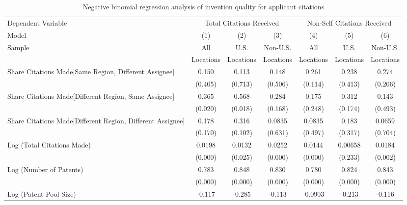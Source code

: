 \begin{sidewaystable}[htbp]\centering
\caption{Negative binomial regression analysis of invention quality for applicant citations \label{a.model123192021}}
\small
\onehalfspacing
\begin{tabular}{l*{6}{c}}
\hline\hline
 Dependent Variable&\multicolumn{3}{c}{Total Citations Received}&\multicolumn{3}{c}{Non-Self Citations Received}\\
                Model&\multicolumn{1}{c}{(1)}&\multicolumn{1}{c}{(2)}&\multicolumn{1}{c}{(3)}&\multicolumn{1}{c}{(4)}&\multicolumn{1}{c}{(5)}&\multicolumn{1}{c}{(6)}\\
                 \hline
 \multirow{2}{*}{Sample}&\multicolumn{1}{c}{All}&\multicolumn{1}{c}{U.S.}&\multicolumn{1}{c}{Non-U.S.}&\multicolumn{1}{c}{All}&\multicolumn{1}{c}{U.S.}&\multicolumn{1}{c}{Non-U.S.}\\       
  &\multicolumn{1}{c}{Locations}&\multicolumn{1}{c}{Locations}&\multicolumn{1}{c}{Locations}&\multicolumn{1}{c}{Locations}&\multicolumn{1}{c}{Locations}&\multicolumn{1}{c}{Locations}\\       
\hline
Share Citations Made[Same Region, Different Assignee]&    0.150&    0.113&    0.148&    0.261&    0.238&    0.274\\
                &  (0.405)&  (0.713)&  (0.506)&  (0.114)&  (0.413)&  (0.206)\\
Share Citations Made[Different Region, Same Assignee]&    0.365&    0.568&    0.284&    0.175&    0.312&    0.143\\
                &  (0.020)&  (0.018)&  (0.168)&  (0.248)&  (0.174)&  (0.493)\\
Share Citations Made[Different Region, Different Assignee]&    0.178&    0.316&   0.0835&   0.0835&    0.183&   0.0659\\
                &  (0.170)&  (0.102)&  (0.631)&  (0.497)&  (0.317)&  (0.704)\\
Log (Total Citations Made)&   0.0198&   0.0132&   0.0252&   0.0144&  0.00658&   0.0184\\
                &  (0.000)&  (0.025)&  (0.000)&  (0.000)&  (0.233)&  (0.002)\\
Log (Number of Patents)&    0.783&    0.848&    0.830&    0.780&    0.824&    0.843\\
                &  (0.000)&  (0.000)&  (0.000)&  (0.000)&  (0.000)&  (0.000)\\
Log (Patent Pool Size)&   -0.117&   -0.285&   -0.113&  -0.0903&   -0.213&   -0.116\\

\end{tabular}
\end{sidewaystable}
